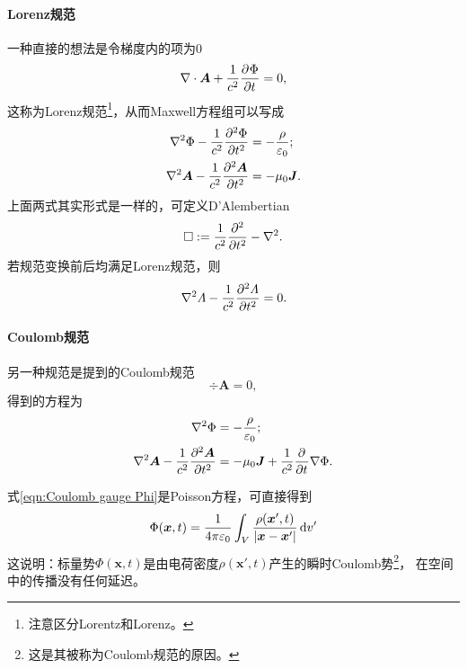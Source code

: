 \paragraph{Lorenz规范}
一种直接的想法是令梯度内的项为0
\begin{equation}
    \div\bm A+\frac1{c^2}\pv\Phi t=0,
\end{equation}
这称为Lorenz规范\footnote{注意区分Lorentz和Lorenz。}，从而Maxwell方程组可以写成
\begin{subequations}
    \begin{align}
        \lapla\Phi-\frac1{c^2}\pv[2]\Phi t&=-\frac\rho{\varepsilon_0};\\
        \lapla\bm A-\frac1{c^2}\pv[2]{\bm A}t&=-\mu_0\bm J.
    \end{align}
\end{subequations}
上面两式其实形式是一样的，可定义D'Alembertian%
\begin{equation}
    \square:=\frac1{c^2}\pp[2]t-\lapla.
\end{equation}
若规范变换前后均满足Lorenz规范，则
\begin{equation}
    \lapla\varLambda-\frac1{c^2}\pv[2]\varLambda t=0.
\end{equation}
\paragraph{Coulomb规范}
另一种规范是提到的Coulomb规范
\[
    \div\bm A=0,
\]
得到的方程为
\begin{subequations}
    \begin{align}
        \label{eqn:Coulomb gauge Phi}
        \lapla\Phi&=-\frac\rho{\varepsilon_0};\\
        \label{eqn:Coulomb gauge A}
        \lapla\bm A-\frac1{c^2}\pv[2]{\bm A}t&=-\mu_0\bm J+\frac1{c^2}\pp t\nabla\Phi.
    \end{align}
\end{subequations}

式\eqref{eqn:Coulomb gauge Phi}是Poisson方程，可直接得到
\[
    \Phi(\bm x,t)=\frac1{4\pi\varepsilon_0}\int_V\frac{\rho(\bm x',t)}{|\bm x-\bm x'|}\d v'
 \]
这说明：标量势$\Phi(\bm x,t)$是由电荷密度$\rho(\bm x',t)$产生的瞬时Coulomb势\footnote{这是其被称为Coulomb规范的原因。}，%
在空间中的传播没有任何延迟。

